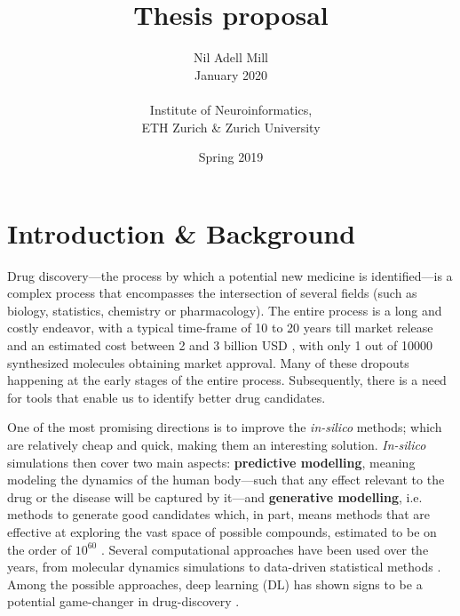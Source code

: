 \documentclass{article}
\begin{document}
\title{\Large Thesis proposal}
\author{Nil Adell Mill \\
        January 2020 \\ \\
        Institute of Neuroinformatics, \\
        ETH Zurich \& Zurich University}
\date{Spring 2019}

\maketitle

    \section*{Introduction \& Background}

Drug discovery---the process by which a potential new medicine is identified---is a
 complex process that encompasses the intersection of several fields (such as biology,
 statistics, chemistry or pharmacology). The entire process is a long and costly
 endeavor, with a typical time-frame of 10 to 20 years till market release and an
 estimated cost between 2 and 3 billion USD \cite{Schneider2019, Scannell2012}, with
 only 1 out of 10000 synthesized molecules obtaining market approval. Many of these
 dropouts happening at the early stages of the entire process.
 {\color{red}Subsequently}, there is a need for tools that enable us to identify better
 drug candidates.

One of the most promising directions is to improve the \emph{in-silico} methods; which
 are relatively cheap and quick, making them an interesting solution. \emph{In-silico}
 simulations then cover two main aspects: \textbf{predictive modelling}, meaning
 modeling the dynamics of the human body---such that any effect relevant to the drug or
 the disease will be captured by it---and \textbf{generative modelling}, i.e. methods to
 generate good candidates which, in part, means methods that are effective at exploring
 the vast space of possible compounds, estimated to be on the order of $10^{60}$
 \cite{Reymond2012}. Several computational approaches have been used over the years,
 from molecular dynamics simulations to data-driven statistical methods \cite{Hung2014,
 Kuhn2016}. Among the possible approaches, deep learning (DL) has shown signs to be a
 potential game-changer in drug-discovery \cite{Dargan2019}. 
 
\end{document}
